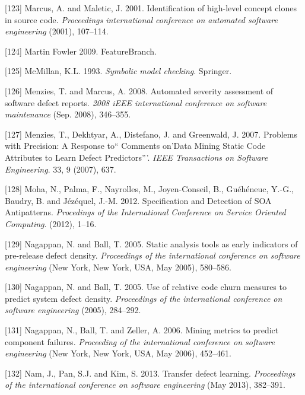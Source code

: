 \documentclass[12pt]{report}
\begin{document}
\hypertarget{ref-Marcus}{}
{[}123{]} Marcus, A. and Maletic, J. 2001. Identification of high-level
concept clones in source code. \emph{Proceedings international
conference on automated software engineering} (2001), 107--114.

\hypertarget{ref-MartinFowler2009}{}
{[}124{]} Martin Fowler 2009. FeatureBranch.

\hypertarget{ref-mcmillan1993symbolic}{}
{[}125{]} McMillan, K.L. 1993. \emph{Symbolic model checking}. Springer.

\hypertarget{ref-Menzies2008}{}
{[}126{]} Menzies, T. and Marcus, A. 2008. Automated severity assessment
of software defect reports. \emph{2008 iEEE international conference on
software maintenance} (Sep. 2008), 346--355.

\hypertarget{ref-menzies2007problems}{}
{[}127{]} Menzies, T., Dekhtyar, A., Distefano, J. and Greenwald, J.
2007. Problems with Precision: A Response to`` Comments on'Data Mining
Static Code Attributes to Learn Defect Predictors'''. \emph{IEEE
Transactions on Software Engineering}. 33, 9 (2007), 637.

\hypertarget{ref-Moha}{}
{[}128{]} Moha, N., Palma, F., Nayrolles, M., Joyen-Conseil, B.,
Guéhéneuc, Y.-G., Baudry, B. and Jézéquel, J.-M. 2012. Specification and
Detection of SOA Antipatterns. \emph{Procedings of the International
Conference on Service Oriented Computing}. (2012), 1--16.

\hypertarget{ref-Nagappan2005}{}
{[}129{]} Nagappan, N. and Ball, T. 2005. Static analysis tools as early
indicators of pre-release defect density. \emph{Proceedings of the
international conference on software engineering} (New York, New York,
USA, May 2005), 580--586.

\hypertarget{ref-Nagappan}{}
{[}130{]} Nagappan, N. and Ball, T. 2005. Use of relative code churn
measures to predict system defect density. \emph{Proceedings of the
international conference on software engineering} (2005), 284--292.

\hypertarget{ref-Nagappan2006}{}
{[}131{]} Nagappan, N., Ball, T. and Zeller, A. 2006. Mining metrics to
predict component failures. \emph{Proceeding of the international
conference on software engineering} (New York, New York, USA, May 2006),
452--461.

\hypertarget{ref-Nam2013}{}
{[}132{]} Nam, J., Pan, S.J. and Kim, S. 2013. Transfer defect learning.
\emph{Proceedings of the international conference on software
engineering} (May 2013), 382--391.
\end{document}
